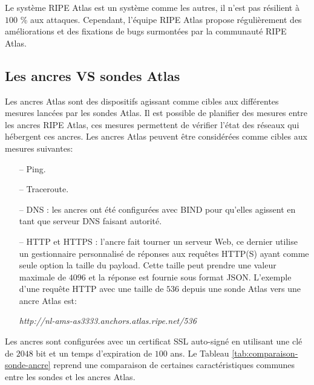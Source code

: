 Le système RIPE Atlas est un système comme les autres, il n'est pas résilient à $100$ \% aux attaques. Cependant, l'équipe RIPE Atlas propose régulièrement des améliorations et des fixations de bugs surmontées par la communauté RIPE Atlas. 


\subsection{Les ancres VS sondes  Atlas} \label{subsec:ancre}

Les ancres  Atlas sont des dispositifs agissant comme cibles aux différentes mesures lancées par les sondes  Atlas. Il est possible de planifier des mesures entre les ancres RIPE Atlas, ces mesures permettent de vérifier l'état des réseaux qui hébergent ces ancres. Les ancres Atlas peuvent être considérées comme  cibles aux mesures suivantes:
\begin{itemize}
	\item[--] Ping.
	\item[--]Traceroute.
	\item[--]DNS : les ancres ont été configurées avec BIND pour qu'elles agissent en tant que serveur DNS faisant autorité.
	\item[--]HTTP et HTTPS : l'ancre fait tourner un serveur Web, ce dernier utilise un gestionnaire  personnalisé de réponses aux requêtes HTTP(S) ayant comme seule option la taille du payload. 	 Cette taille peut prendre une valeur maximale de $4096$ et la réponse est fournie sous format JSON. L'exemple d'une requête HTTP avec une taille de $536$ depuis une sonde Atlas vers une ancre Atlas est: 
	\begin{center}
		\begin{tcolorbox}
			\textit{http://nl-ams-as3333.anchors.atlas.ripe.net/536}
		\end{tcolorbox}
	\end{center}
\end{itemize}
Les ancres sont configurées avec un certificat SSL auto-signé en utilisant une clé de $2048$ bit et un temps d'expiration de $100$ ans. Le Tableau \ref{tab:comparaison-sonde-ancre} reprend une comparaison de certaines caractéristiques communes entre les sondes et les ancres  Atlas.

